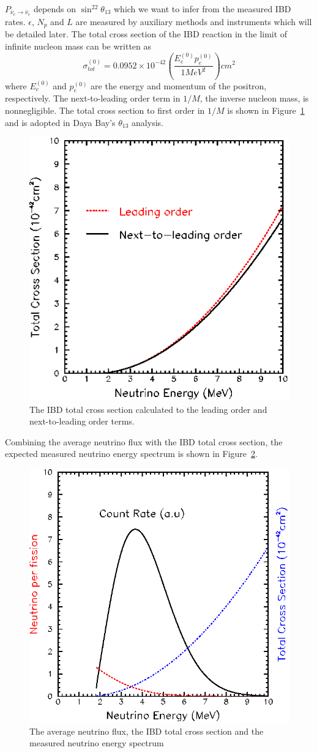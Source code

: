 $P_{\bar{\nu}_e\rightarrow\bar{\nu}_e}$ depends on $\sin^22\theta_{13}$ which we want to infer from the measured IBD rates. $\epsilon$, $N_p$ and $L$ are measured by auxiliary methods and instruments which will be detailed later. The total cross section of the IBD reaction in the limit of infinite nucleon mass can be written as~\cite{Vogel1999}
\begin{equation}
	\sigma^{(0)}_{tot}=0.0952\times 10^{-42} \left( \frac{E^{(0)}_ep^{(0)}_e}{1 MeV^2}\right) cm^2
\end{equation}
where $E^{(0)}_e$ and $p^{(0)}_e$ are the energy and momentum of the positron, respectively. The next-to-leading order term in $1/M$, the inverse nucleon mass, is nonnegligible. The total cross section to first order in $1/M$ is shown in Figure~\ref{fig:IBD_total_cross_section} and is adopted in Daya Bay's $\theta_{13}$ analysis.
\begin{figure}
	\centering
	\includegraphics[width=.4\textwidth]{figures/chap2/IBD_total_cross_section.eps}
	\caption{The IBD total cross section calculated to the leading order and next-to-leading order terms.}
	\label{fig:IBD_total_cross_section}
\end{figure}
Combining the average neutrino flux with the IBD total cross section, the expected measured neutrino energy spectrum is shown in Figure~\ref{fig:IBD_rate}.
\begin{figure}
	\centering
	\includegraphics[width=.4\textwidth]{figures/chap2/IBD_rate.eps}
	\caption{The average neutrino flux, the IBD total cross section and the measured neutrino energy spectrum}
	\label{fig:IBD_rate}
\end{figure}


